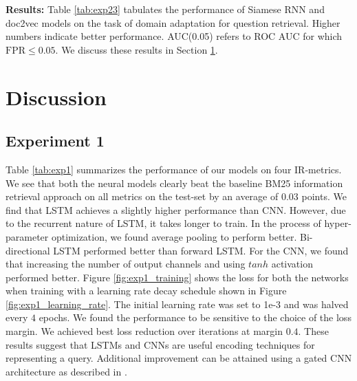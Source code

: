 \documentclass{sigkddExp}
\begin{document}
\textbf{Results:} Table \ref{tab:exp23} tabulates the performance of Siamese RNN and \textsf{doc2vec} models on the task of domain adaptation for question retrieval. Higher numbers indicate better performance. AUC(0.05) refers to ROC AUC for which $\mathrm{FPR} \leq 0.05$. We discuss these results in Section \ref{discussion}.

\section{Discussion}
\label{discussion}
\subsection{Experiment 1}
Table \ref{tab:exp1} summarizes the performance of our models on four IR-metrics. We see that both the neural models clearly beat the baseline \textsf{BM25} information retrieval approach on all metrics on the test-set by an average of 0.03 points. We find that LSTM achieves a slightly higher performance than CNN. However, due to the recurrent nature of LSTM, it takes longer to train. In the process of hyper-parameter optimization, we found average pooling to perform better. Bi-directional LSTM performed better than forward LSTM. For the CNN, we found that increasing the number of output channels and using $tanh$ activation performed better. Figure \ref{fig:exp1_training} shows the loss for both the networks when training with a learning rate decay schedule shown in Figure \ref{fig:exp1_learning_rate}. The initial learning rate was set to 1e-3 and was halved every $4$ epochs. We found the performance to be sensitive to the choice of the loss margin. We achieved best loss reduction over iterations at margin $0.4$. These results suggest that LSTMs and CNNs are useful encoding techniques for representing a query. Additional improvement can be attained using a gated CNN architecture as described in \cite{lei2015semi}.
\end{document}
